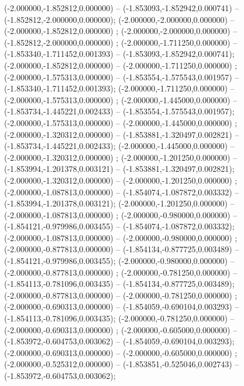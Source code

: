  (-2.000000,-1.852812,0.000000) -- (-1.853093,-1.852942,0.000741) -- (-1.852812,-2.000000,0.000000);
 (-2.000000,-2.000000,0.000000) -- (-2.000000,-1.852812,0.000000) ;
 (-2.000000,-2.000000,0.000000) -- (-1.852812,-2.000000,0.000000) ;
 (-2.000000,-1.711250,0.000000) -- (-1.853340,-1.711452,0.001393) -- (-1.853093,-1.852942,0.000741);
 (-2.000000,-1.852812,0.000000) -- (-2.000000,-1.711250,0.000000) ;
 (-2.000000,-1.575313,0.000000) -- (-1.853554,-1.575543,0.001957) -- (-1.853340,-1.711452,0.001393);
 (-2.000000,-1.711250,0.000000) -- (-2.000000,-1.575313,0.000000) ;
 (-2.000000,-1.445000,0.000000) -- (-1.853734,-1.445221,0.002433) -- (-1.853554,-1.575543,0.001957);
 (-2.000000,-1.575313,0.000000) -- (-2.000000,-1.445000,0.000000) ;
 (-2.000000,-1.320312,0.000000) -- (-1.853881,-1.320497,0.002821) -- (-1.853734,-1.445221,0.002433);
 (-2.000000,-1.445000,0.000000) -- (-2.000000,-1.320312,0.000000) ;
 (-2.000000,-1.201250,0.000000) -- (-1.853994,-1.201378,0.003121) -- (-1.853881,-1.320497,0.002821);
 (-2.000000,-1.320312,0.000000) -- (-2.000000,-1.201250,0.000000) ;
 (-2.000000,-1.087813,0.000000) -- (-1.854074,-1.087872,0.003332) -- (-1.853994,-1.201378,0.003121);
 (-2.000000,-1.201250,0.000000) -- (-2.000000,-1.087813,0.000000) ;
 (-2.000000,-0.980000,0.000000) -- (-1.854121,-0.979986,0.003455) -- (-1.854074,-1.087872,0.003332);
 (-2.000000,-1.087813,0.000000) -- (-2.000000,-0.980000,0.000000) ;
 (-2.000000,-0.877813,0.000000) -- (-1.854134,-0.877725,0.003489) -- (-1.854121,-0.979986,0.003455);
 (-2.000000,-0.980000,0.000000) -- (-2.000000,-0.877813,0.000000) ;
 (-2.000000,-0.781250,0.000000) -- (-1.854113,-0.781096,0.003435) -- (-1.854134,-0.877725,0.003489);
 (-2.000000,-0.877813,0.000000) -- (-2.000000,-0.781250,0.000000) ;
 (-2.000000,-0.690313,0.000000) -- (-1.854059,-0.690104,0.003293) -- (-1.854113,-0.781096,0.003435);
 (-2.000000,-0.781250,0.000000) -- (-2.000000,-0.690313,0.000000) ;
 (-2.000000,-0.605000,0.000000) -- (-1.853972,-0.604753,0.003062) -- (-1.854059,-0.690104,0.003293);
 (-2.000000,-0.690313,0.000000) -- (-2.000000,-0.605000,0.000000) ;
 (-2.000000,-0.525312,0.000000) -- (-1.853851,-0.525046,0.002743) -- (-1.853972,-0.604753,0.003062);
